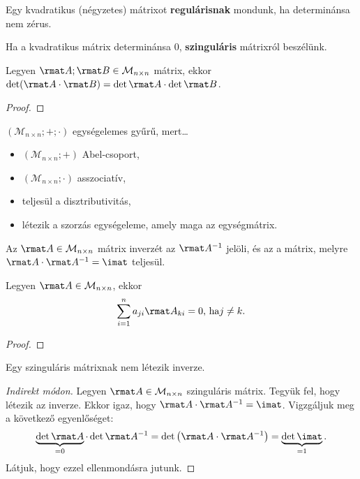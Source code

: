 \begin{definition}
  Egy kvadratikus (négyzetes) mátrixot \textbf{regulárisnak} mondunk, ha
  determinánsa nem zérus.

  Ha a kvadratikus mátrix determinánsa 0, \textbf{szinguláris} mátrixról
  beszélünk.
\end{definition}

\begin{theorem}
  Legyen $\rmat A; \rmat B \in \mathcal M_{n \times n}$ mátrix, ekkor
  $\det(\rmat A \cdot \rmat B) = \det \rmat A \cdot \det \rmat B$.

  \begin{proof}
    \vspace{8em}
  \end{proof}
\end{theorem}

\begin{statement}
  $(\mathcal M_{n \times n}; +; \cdot)$ egységelemes gyűrű, mert\dots
  \begin{itemize}
    \item  $(\mathcal M_{n \times n}; +)$ Abel-csoport,
    \item $(\mathcal M_{n \times n}; \cdot)$ asszociatív,
    \item teljesül a disztributivitás,
    \item létezik a szorzás egységeleme, amely maga az egységmátrix.
  \end{itemize}
\end{statement}

\begin{definition}
  Az $\rmat A \in \mathcal M_{n \times n}$ mátrix inverzét az $\rmat A^{-1}$
  jelöli, és az a mátrix, melyre $\rmat A \cdot \rmat A^{-1} = \imat$
  teljesül.
\end{definition}

\begin{theorem}
  Legyen $\rmat A \in \mathcal M_{n \times n}$, ekkor
  $$
    \sum_{i=1}^{n} a_{ji} \rmat A_{ki} = 0
    \text{, ha}
    j \neq k
    \text.
  $$

  \begin{proof}
    \vspace{6em}
  \end{proof}
\end{theorem}

\begin{statement}
  Egy szinguláris mátrixnak nem létezik inverze.

  \begin{proof}[Indirekt módon]
    Legyen $\rmat A \in \mathcal M_{n \times n}$ szinguláris mátrix. Tegyük fel,
    hogy létezik az inverze. Ekkor igaz, hogy
    $\rmat A \cdot \rmat A^{-1} = \imat$.
    Vigzgáljuk meg a következő egyenlőséget:
    $$
      \underbrace{\det \rmat A}_{=0} \cdot \det \rmat A^{-1}
      = \det \left( \rmat A \cdot \rmat A^{-1} \right)
      = \underbrace{\det \imat}_{=1}
      \text.
    $$
    Látjuk, hogy ezzel ellenmondásra jutunk.
  \end{proof}
\end{statement}

